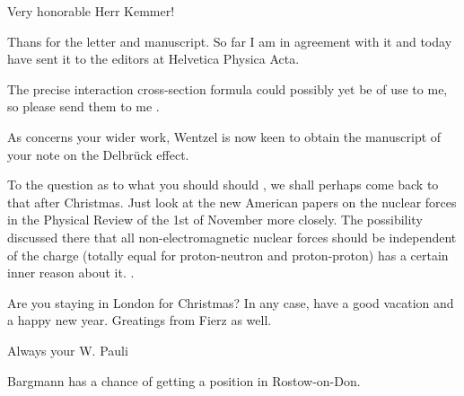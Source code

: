 \date{December 15, 1936}

Very honorable Herr Kemmer!

Thans for the letter and manuscript. So far I am in agreement with it and today have sent it to the editors at Helvetica Physica Acta.

The precise interaction cross-section formula could possibly yet be of use to me, so please send them to me .

As concerns your wider work, Wentzel is now keen to obtain the manuscript of your note on the Delbr\"uck effect.

To the question as to what you should should , we shall perhaps come back to that after Christmas. Just look at the new American papers on the nuclear forces in the Physical Review of the 1st of November more closely. The possibility discussed there that all non-electromagnetic nuclear forces should be independent of the charge (totally equal for proton-neutron and proton-proton) has a certain inner reason about it. .

Are you staying in London for Christmas? In any case, have a good vacation and a happy new year. Greatings from Fierz as well.

Always your W. Pauli

Bargmann has a chance of getting a position in Rostow-on-Don.%
